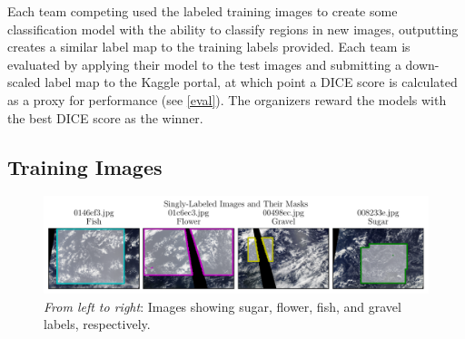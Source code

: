Each team competing used the labeled training images to create some classification model with the ability to classify regions in new images, outputting creates a similar label map to the training labels provided. Each team is evaluated by applying their model to the test images and submitting a down-scaled label map to the Kaggle portal, at which point a DICE score is calculated as a proxy for performance (see \cref{eval}). The organizers reward the models with the best DICE score as the winner. 

\subsection*{Training Images}
\begin{figure}[htbp]
    \centering
    \includegraphics[width=\linewidth]{figs/single_labels.pdf}
    \caption{\textit{From left to right}: Images showing sugar, flower, fish, and gravel labels, respectively.}
    \label{fig:labeled_imgs}
\end{figure}
%
